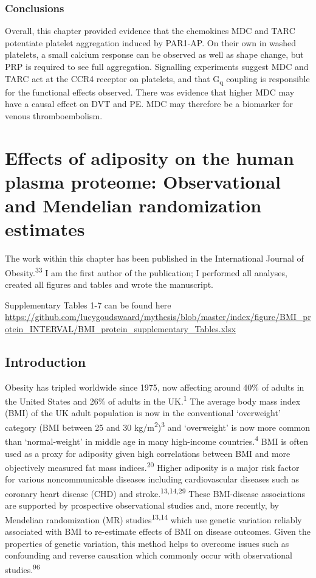 \documentclass[11pt,twoside]{bristolthesis}
\begin{document}
\hypertarget{conclusions}{%
\subsection{Conclusions}\label{conclusions}}

Overall, this chapter provided evidence that the chemokines MDC and TARC potentiate platelet aggregation induced by PAR1-AP. On their own in washed platelets, a small calcium response can be observed as well as shape change, but PRP is required to see full aggregation. Signalling experiments suggest MDC and TARC act at the CCR4 receptor on platelets, and that G\textsubscript{q} coupling is responsible for the functional effects observed. There was evidence that higher MDC may have a causal effect on DVT and PE. MDC may therefore be a biomarker for venous thromboembolism.

\hypertarget{BMI-protein-MR}{%
\chapter{Effects of adiposity on the human plasma proteome: Observational and Mendelian randomization estimates}\label{BMI-protein-MR}}

The work within this chapter has been published in the International Journal of Obesity.\textsuperscript{33} I am the first author of the publication; I performed all analyses, created all figures and tables and wrote the manuscript.

Supplementary Tables 1-7 can be found here \url{https://github.com/lucygoudswaard/mythesis/blob/master/index/figure/BMI_protein_INTERVAL/BMI_protein_supplementary_Tables.xlsx}

\hypertarget{introduction-1}{%
\section{Introduction}\label{introduction-1}}

Obesity has tripled worldwide since 1975, now affecting around 40\% of adults in the United States and 26\% of adults in the UK.\textsuperscript{1} The average body mass index (BMI) of the UK adult population is now in the conventional `overweight' category (BMI between 25 and 30 kg/m\textsuperscript{2})\textsuperscript{3} and `overweight' is now more common than `normal-weight' in middle age in many high-income countries.\textsuperscript{4} BMI is often used as a proxy for adiposity given high correlations between BMI and more objectively measured fat mass indices.\textsuperscript{20} Higher adiposity is a major risk factor for various noncommunicable diseases including cardiovascular diseases such as coronary heart disease (CHD) and stroke.\textsuperscript{13,14,29} These BMI-disease associations are supported by prospective observational studies and, more recently, by Mendelian randomization (MR) studies\textsuperscript{13,14} which use genetic variation reliably associated with BMI to re-estimate effects of BMI on disease outcomes. Given the properties of genetic variation, this method helps to overcome issues such as confounding and reverse causation which commonly occur with observational studies.\textsuperscript{96}
\end{document}
